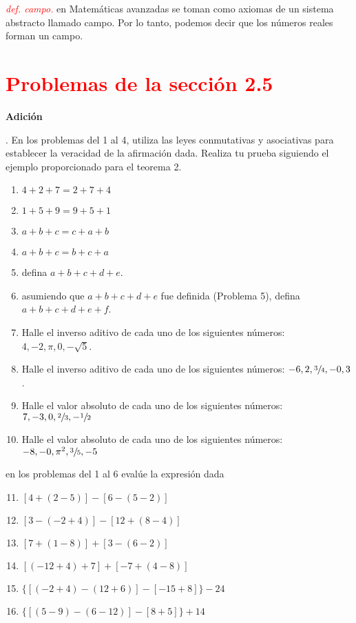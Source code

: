 \documentclass[10pt,a4paper]{article}
\author{Darien R Pajaro}
\begin{document}
\begin{flushleft}
\textcolor{red}{\textit{def. campo.}} en Matemáticas avanzadas se toman como axiomas de un sistema abstracto llamado campo. Por lo tanto, podemos decir que los números reales forman un campo.
\end{flushleft}
\section*{\textcolor{red}{Problemas de la sección 2.5}}

\begin{flushleft}
{\bfseries Adición}
\end{flushleft}.
En los problemas del 1 al 4, utiliza las leyes conmutativas y asociativas para establecer la veracidad de la afirmación dada. Realiza tu prueba siguiendo el ejemplo proporcionado para el teorema 2. 
\begin{multicols}{2}
\begin{enumerate}[label=\textbf{\arabic*.}]
  \item ${4+2+7=2+7+4}$
  \item ${1+5+9=9+5+1}$
  \item ${a+b+c=c+a+b}$
  \item ${a+b+c=b+c+a}$
  \item defina ${a+b+c+d+e}$. 
  \item asumiendo que ${a+b+c+d+e}$ fue definida (Problema 5), defina ${a+b+c+d+e+f}$.
  \item Halle el inverso aditivo de cada uno de los siguientes números: ${ 4,-2,\pi,0,-\sqrt{5}}$.
  \item Halle el inverso aditivo de cada uno de los siguientes números: ${ -6,2,\sfrac{3}{4},-0,3}$.
  \item Halle el valor absoluto de cada uno de los siguientes números: ${ 7,-3,0,\sfrac{2}{3},-\sfrac{1}{2}}$
   \item Halle el valor absoluto de cada uno de los siguientes números: ${ -8,-0,\pi^{2},\sfrac{3}{5},-5}$\\
\end{enumerate}
\end{multicols}
en los problemas del 1 al 6 evalúe la expresión dada
\begin{enumerate}[label=\textbf{\arabic*.}]
 \setcounter{enumi}{10}
    \item ${[4+(2-5)]-[6-(5-2)]}$
    \item ${[3-(-2+4)]-[12+(8-4)]}$
    \item ${[7+(1-8)]+[3-(6-2)]}$
    \item ${[(-12+4)+7]+[-7+(4-8)]}$
    \item ${\lbrace[(-2+4)-(12+6)]-[-15+8]\rbrace-24}$
    \item ${\lbrace[(5-9)-(6-12)]-[8+5]\rbrace+14}$    
\end{enumerate}
\end{document}
